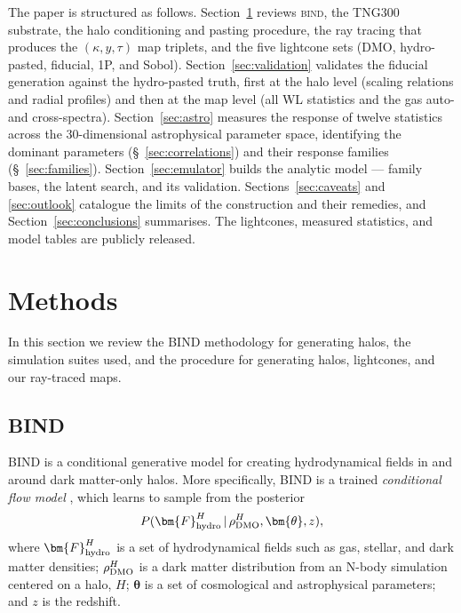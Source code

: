 \documentclass[linenumbers,trackchanges, twocolumn]{aastex701}
\begin{document}
\medskip
\noindent
The paper is structured as follows.
Section~\ref{sec:methods} reviews \textsc{bind}, the TNG300 substrate, the
halo conditioning and pasting procedure, the ray tracing that produces the
$(\kappa, y, \tau)$ map triplets, and the five lightcone sets (DMO,
hydro-pasted, fiducial, 1P, and Sobol).
Section~\ref{sec:validation} validates the fiducial generation against the
hydro-pasted truth, first at the halo level (scaling relations and radial
profiles) and then at the map level (all WL statistics and the gas auto- and
cross-spectra).
Section~\ref{sec:astro} measures the response of twelve statistics across
the 30-dimensional astrophysical parameter space, identifying the dominant
parameters (\S~\ref{sec:correlations}) and their response families
(\S~\ref{sec:families}).
Section~\ref{sec:emulator} builds the analytic model --- family bases, the
latent search, and its validation.
Sections~\ref{sec:caveats} and \ref{sec:outlook} catalogue the limits of the
construction and their remedies, and Section~\ref{sec:conclusions}
summarises.
The lightcones, measured statistics, and model tables are publicly
released.

\section{Methods}\label{sec:methods}
In this section we review the BIND methodology for generating halos, the simulation suites used, and the procedure for generating halos, lightcones, and our ray-traced maps.
 
\subsection{BIND}\label{sec:bind}
BIND is a conditional generative model for creating hydrodynamical fields in and around dark matter-only halos. More specifically, BIND is a trained \textit{conditional flow model} \citep{Lipman-2024, kannan-2025}, which learns to sample from the posterior
\begin{equation}\label{eq:bind_posterior}
P(\bm{F}^H_{\rm hydro} \,|\, \rho^H_{\rm DMO}, \bm{\theta}, z),
\end{equation}
where $\bm{F}^H_{\rm hydro}$ is a set of hydrodynamical fields such as gas, stellar, and dark matter densities; $\rho^H_{\rm DMO}$ is a dark matter distribution from an N-body simulation centered on a halo, $H$; $\bm{\theta}$ is a set of cosmological and astrophysical parameters; and $z$ is the redshift.
 
\end{document}
